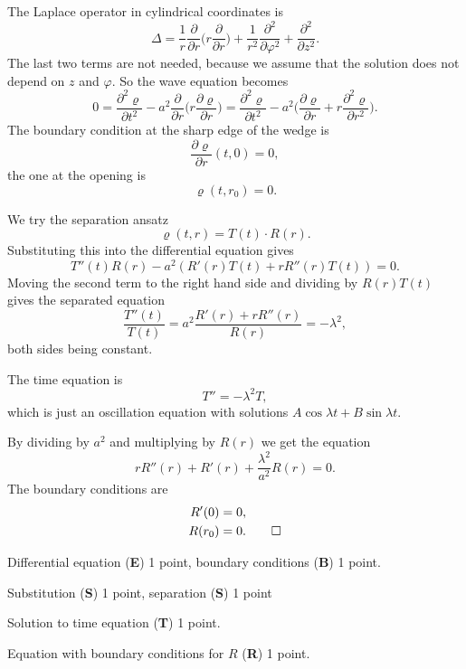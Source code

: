 \begin{loesung}
\begin{teilaufgaben}
\item
The Laplace operator in cylindrical coordinates is
\[
\Delta = 
\frac{1}{r}\frac{\partial}{\partial r}
\biggl(r\frac{\partial}{\partial r}\biggr)
+
\frac1{r^2}\frac{\partial^2}{\partial \varphi^2}
+
\frac{\partial^2}{\partial z^2}.
\]
The last two terms are not needed, because we assume that the solution
does not depend on $z$ and $\varphi$.
So the wave equation becomes
\[
0
=
\frac{\partial^2\varrho}{\partial t^2}
-
a^2\frac{\partial}{\partial r}\biggl(r\frac{\partial\varrho}{\partial r}\biggr)
=
\frac{\partial^2\varrho}{\partial t^2}
-
a^2
\biggl(
\frac{\partial\varrho}{\partial r}
+
r
\frac{\partial^2\varrho}{\partial r^2}
\biggr).
\]
The boundary condition at the sharp edge of the wedge is
\[
\frac{\partial\varrho}{\partial r}(t,0)=0,
\]
the one at the opening is
\[
\varrho(t, r_0) = 0.
\]
\item
We try the separation ansatz
\[
\varrho(t,r) = T(t) \cdot R(r).
\]
Substituting this into the differential equation gives
\[
T''(t) R(r) - a^2 (R'(r)T(t) + rR''(r)T(t)) = 0.
\]
Moving the second term to the right hand side and dividing by $R(r)T(t)$
gives the separated equation
\[
\frac{T''(t)}{T(t)}
=
a^2 \frac{R'(r)+rR''(r)}{R(r)}
=
-\lambda^2,
\]
both sides being constant.
\item
The time equation is 
\[
T'' = -\lambda^2 T,
\]
which is just an oscillation equation with solutions
$A\cos\lambda t+B\sin\lambda t$.
\item
By dividing by $a^2$ and multiplying by $R(r)$ we get the equation
\[
rR''(r) + R'(r) +\frac{\lambda^2}{a^2}R(r)=0.
\]
The boundary conditions are
\begin{align*}
R'(0) &= 0,\\
R(r_0) &= 0.
\qedhere
\end{align*}
\end{teilaufgaben}
\end{loesung}

\begin{bewertung}
\begin{teilaufgaben}
\item Differential equation ({\bf E}) 1 point,
boundary conditions ({\bf B}) 1 point.
\item
Substitution ({\bf S}) 1 point,
separation ({\bf S}) 1 point
\item
Solution to time equation ({\bf T}) 1 point.
\item
Equation with boundary conditions for $R$ ({\bf R}) 1 point.
\end{teilaufgaben}
\end{bewertung}

